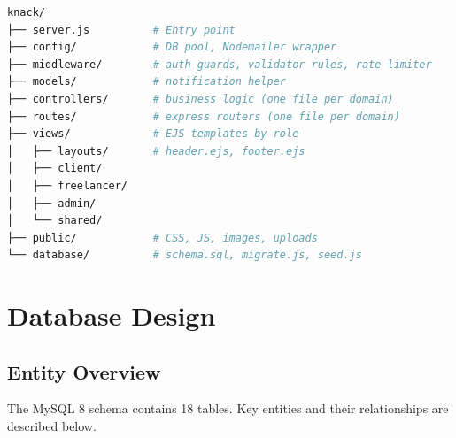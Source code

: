 \documentclass[12pt,a4paper]{article}
\begin{document}
\begin{lstlisting}[language=bash, caption={Top-level project layout}]
knack/
├── server.js          # Entry point
├── config/            # DB pool, Nodemailer wrapper
├── middleware/        # auth guards, validator rules, rate limiter
├── models/            # notification helper
├── controllers/       # business logic (one file per domain)
├── routes/            # express routers (one file per domain)
├── views/             # EJS templates by role
│   ├── layouts/       # header.ejs, footer.ejs
│   ├── client/
│   ├── freelancer/
│   ├── admin/
│   └── shared/
├── public/            # CSS, JS, images, uploads
└── database/          # schema.sql, migrate.js, seed.js
\end{lstlisting}

\section{Database Design}

\subsection{Entity Overview}

The MySQL 8 schema contains 18 tables. Key entities and their relationships are described below.
\end{document}
